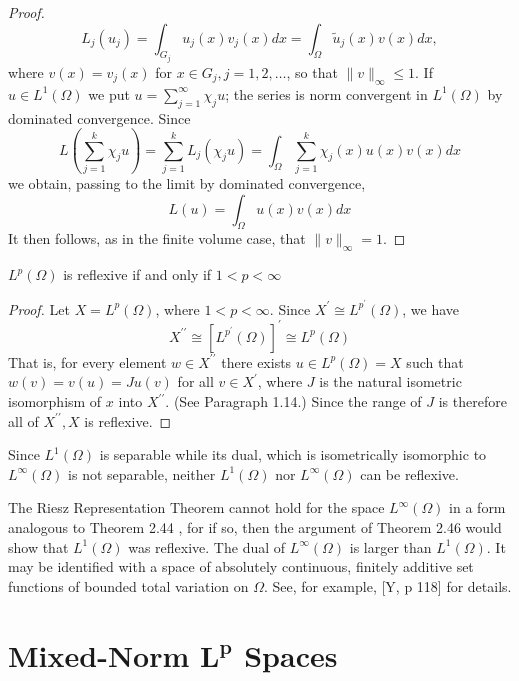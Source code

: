 \begin{proof}
  \[
  L_j\left(u_j\right)=\int_{G_j} u_j(x) v_j(x) d x=\int_{\Omega} \tilde{u}_j(x) v(x) d x,
  \]
  where $v(x)=v_j(x)$ for $x \in G_j, j=1,2, \ldots$, so that $\|v\|_{\infty} \leq 1$. If $u \in L^1(\Omega)$ we put $u=\sum_{j=1}^{\infty} \chi_j u$; the series is norm convergent in $L^1(\Omega)$ by dominated convergence. Since
  \[
  L\left(\sum_{j=1}^k \chi_j u\right)=\sum_{j=1}^k L_j\left(\chi_j u\right)=\int_{\Omega} \sum_{j=1}^k \chi_j(x) u(x) v(x) d x
  \]
  we obtain, passing to the limit by dominated convergence,
  \[
  L(u)=\int_{\Omega} u(x) v(x) d x
  \]
  It then follows, as in the finite volume case, that $\|v\|_{\infty}=1$.
\end{proof}


\begin{theorem}
  $L^p(\Omega)$ is reflexive if and only if $1<p<\infty$
\end{theorem}

\begin{proof}
  Let $X=L^p(\Omega)$, where $1<p<\infty$. Since $X^{\prime} \cong L^{p^{\prime}}(\Omega)$, we have
  \[
  X^{\prime \prime} \cong\left[L^{p^{\prime}}(\Omega)\right]^{\prime} \cong L^p(\Omega)
  \]
  That is, for every element $w \in X^{\prime \prime}$ there exists $u \in L^p(\Omega)=X$ such that $w(v)=v(u)=J u(v)$ for all $v \in X^{\prime}$, where $J$ is the natural isometric isomorphism of $x$ into $X^{\prime \prime}$. (See Paragraph 1.14.) Since the range of $J$ is therefore all of $X^{\prime \prime}, X$ is reflexive.
\end{proof}

Since $L^1(\Omega)$ is separable while its dual, which is isometrically isomorphic to $L^{\infty}(\Omega)$ is not separable, neither $L^1(\Omega)$ nor $L^{\infty}(\Omega)$ can be reflexive.

\begin{para}
  The Riesz Representation Theorem cannot hold for the space $L^{\infty}(\Omega)$ in a form analogous to Theorem 2.44 , for if so, then the argument of Theorem 2.46 would show that $L^1(\Omega)$ was reflexive. The dual of $L^{\infty}(\Omega)$ is larger than $L^1(\Omega)$. It may be identified with a space of absolutely continuous, finitely additive set functions of bounded total variation on $\Omega$. See, for example, [Y, p 118] for details.
\end{para}


\section[Mixed-Norm $L^p$ Spaces]{Mixed-Norm $\bm{L^p}$ Spaces}

